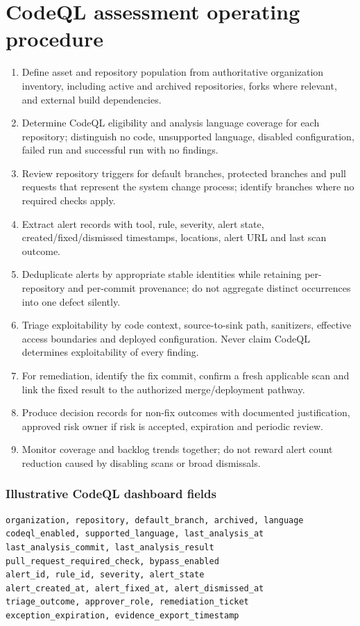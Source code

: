 \documentclass[10pt,oneside]{report}
\begin{document}
\chapter{CodeQL assessment operating procedure}
\begin{enumerate}
\item Define asset and repository population from authoritative organization inventory, including active and archived repositories, forks where relevant, and external build dependencies.
\item Determine CodeQL eligibility and analysis language coverage for each repository; distinguish no code, unsupported language, disabled configuration, failed run and successful run with no findings.
\item Review repository triggers for default branches, protected branches and pull requests that represent the system change process; identify branches where no required checks apply.
\item Extract alert records with tool, rule, severity, alert state, created/fixed/dismissed timestamps, locations, alert URL and last scan outcome.
\item Deduplicate alerts by appropriate stable identities while retaining per-repository and per-commit provenance; do not aggregate distinct occurrences into one defect silently.
\item Triage exploitability by code context, source-to-sink path, sanitizers, effective access boundaries and deployed configuration. Never claim CodeQL determines exploitability of every finding.
\item For remediation, identify the fix commit, confirm a fresh applicable scan and link the fixed result to the authorized merge/deployment pathway.
\item Produce decision records for non-fix outcomes with documented justification, approved risk owner if risk is accepted, expiration and periodic review.
\item Monitor coverage and backlog trends together; do not reward alert count reduction caused by disabling scans or broad dismissals.
\end{enumerate}

\subsection{Illustrative CodeQL dashboard fields}
\begin{lstlisting}[language={},caption={Suggested analytics schema, not an API response contract}]
organization, repository, default_branch, archived, language
codeql_enabled, supported_language, last_analysis_at
last_analysis_commit, last_analysis_result
pull_request_required_check, bypass_enabled
alert_id, rule_id, severity, alert_state
alert_created_at, alert_fixed_at, alert_dismissed_at
triage_outcome, approver_role, remediation_ticket
exception_expiration, evidence_export_timestamp
\end{lstlisting}
\end{document}
